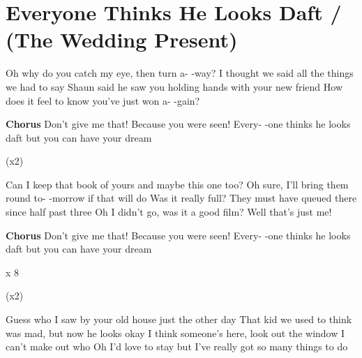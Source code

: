 \section{Everyone Thinks He Looks Daft / (The Wedding Present)}\label{sec:everyone_thinks_he_looks_daft}
Oh why do you catch my eye, then turn a- -way?
I thought we said all the things we had to say
Shaun said he saw you holding hands with your new
friend 
How does it feel to know you've just won a- 
-gain? 

\textbf{Chorus}
Don't give me that! 
Because you were seen! 
Every- -one thinks he looks daft but you can 
have your dream 

(x2)

Can I keep that book of yours and maybe this one 
too? 
Oh sure, I'll bring them round to- -morrow if that
will do 
Was it really full? They must have queued there
since half past three 
Oh I didn't go, was it a good film? Well that's just
me! 

\textbf{Chorus}
Don't give me that! 
Because you were seen! 
Every- -one thinks he looks daft but you can 
have your dream 

x 8

(x2)

Guess who I saw by your old house just the other 
day 
That kid we used to think was mad, but now he looks
okay 
I think someone's here, look out the window
I can't make out who 
Oh I'd love to stay but I've really got so many
things to do 


